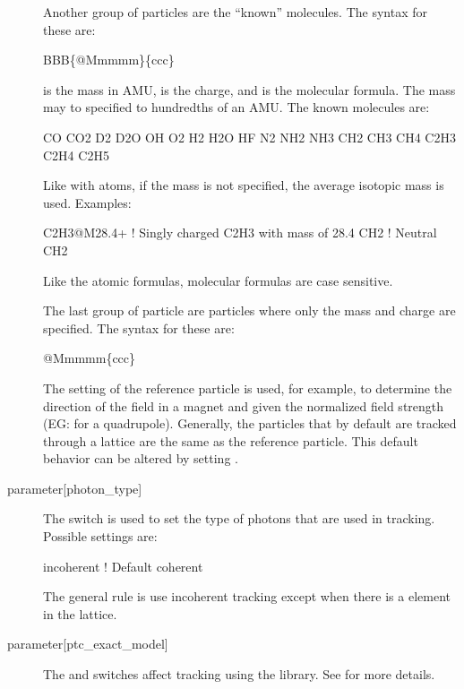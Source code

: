 \begin{description}
Another group of particles are the ``known'' molecules. The syntax for these are:
\begin{example}
  BBB\{@Mmmmm\}\{ccc\}
\end{example}
 is the mass in AMU,  is the charge, and  is the molecular
formula. The mass may to specified to hundredths of an AMU. The known molecules are:
\begin{example}
CO       CO2      
D2       D2O      
OH       O2      
H2       H2O      HF
N2       NH2      NH3      
CH2      CH3      CH4      
C2H3     C2H4     C2H5
\end{example}
Like with atoms, if the mass is not specified, the average isotopic mass is used. Examples:
\begin{example}
  C2H3@M28.4+     ! Singly charged C2H3 with mass of 28.4
  CH2             ! Neutral CH2
\end{example}
Like the atomic formulas, molecular formulas are case sensitive.

The last group of particle are particles where only the mass and charge are specified.
The syntax for these are:
\begin{example}
  @Mmmmm\{ccc\}
\end{example}

The setting of the reference particle is
used, for example, to determine the direction of the field in a magnet
and given the normalized field strength (EG:  for a
quadrupole).  Generally, the particles that by default are tracked
through a lattice are the same as the reference particle. This default
behavior can be altered by setting
.

  \item[{parameter[photon_type]}] \Newline
The  switch is used to set the type of photons that
are used in tracking. Possible settings are:
\begin{example}
  incoherent    ! Default
  coherent 
\end{example}
The general rule is use incoherent tracking except when there is a
 element in the lattice. 

  \item[{parameter[ptc_exact_model]}] \Newline
The  and  switches affect
tracking using the  library. See  for more
details.


\end{description}
